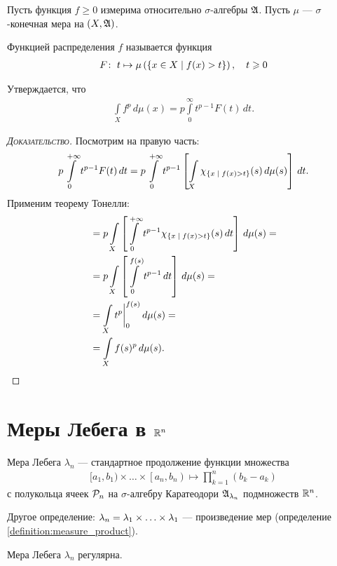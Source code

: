 \begin{exmpl}
 Пусть функция $f \geqslant 0$ измерима относительно $\sigma$-алгебры $\mathfrak{A}$. Пусть $\mu$ --- $\sigma$-конечная мера на $(X, \mathfrak{A})$.

 Функцией распределения $f$ называется функция \begin{align*}
  F \colon\; t \mapsto \mu \left( \left\{ x \in X \;\middle|\; f(x) > t \right\} \right), \quad t \geqslant 0
 \end{align*} 

 Утверждается, что \begin{align*}
  \int\limits_{X} f^{p} \, d\mu(x)  = p \int\limits_{0}^{\infty} t^{p-1}F(t) \, dt
 .\end{align*} 
\end{exmpl}
\begin{proof}[\normalfont\textsc{Доказательство}]
 Посмотрим на правую часть: \begin{align*}
  p \int\limits_{0}^{+\infty} t^{p-1}F(t) \, dt = p \int\limits_0^{+\infty} t^{p-1} \left[ \int\limits_{X} \chi_{\left\{ x \;\middle|\; f(x) > t \right\}}(s) \, d\mu(s) \right]   \, dt
 .\end{align*}  Применим теорему Тонелли: \begin{align*}
 &= p \int\limits_{X} \left[ \int\limits_{0}^{+\infty} t^{p - 1}\chi_{\left\{ x \;\middle|\; f(x) > t \right\}}(s) \, dt \right]  \, d\mu(s) = \\
 &=  p \int\limits_{X} \left[ \int\limits_{0}^{f(s)} t^{p-1} \, dt \right]  \, d\mu (s) = \\
 &= \int\limits_{X} t^{p} \bigg\rvert_0^{f(s)} \, d\mu(s)   = \\
 &= \int\limits_{X} f(s)^{p} \, d\mu(s)
 .\end{align*} 
\end{proof}

\section{Меры Лебега в $\mathbb{R}^{n}$}

\begin{df}
 Мера Лебега $\lambda_n$ --- стандартное продолжение  функции множества \begin{align*}
  [a_1, b_1) \times \ldots \times \left[a_n, b_n\right) \mapsto \prod_{k=1}^{n} (b_k - a_k)
 \end{align*} с полукольца ячеек $\mathcal{P}_n$ на $\sigma$-алгебру Каратеодори $\mathfrak{A}_{\lambda_n}$ подмножеств $\mathbb{R}^{n}$.

 Другое определение: $\lambda_n = \lambda_{1} \times \ldots \times \lambda_{1}$ --- произведение мер (определение \ref{definition:measure_product}).
\end{df}
\begin{thm}
 \label{theorem:lebesgue_measure_is_regular}
 Мера Лебега $\lambda_n$ регулярна.
\end{thm}

